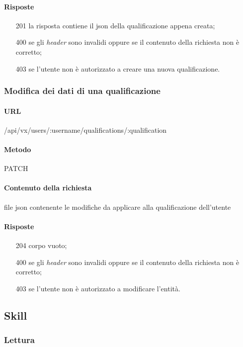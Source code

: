\paragraph{Risposte}
\begin{itemize}
	\item[201] la risposta contiene il \gls{json} della qualificazione appena creata;
	\item[400] se gli \emph{header} sono invalidi oppure se il contenuto della richiesta non è corretto;
	\item[403] se l'utente non è autorizzato a creare una nuova qualificazione.
\end{itemize}

\subsubsection{Modifica dei dati di una qualificazione}
\paragraph{URL}
/api/vx/users/:username/qualifications/:qualification
\paragraph{Metodo}
PATCH
\paragraph{Contenuto della richiesta}
file \gls{json} contenente le modifiche da applicare alla qualificazione dell'utente
\paragraph{Risposte}
\begin{itemize}
	\item[204] corpo vuoto;
	\item[400] se gli \emph{header} sono invalidi oppure se il contenuto della richiesta non è corretto;
	\item[403] se l'utente non è autorizzato a modificare l'entità.
\end{itemize}

\subsection{Skill}

\subsubsection{Lettura}
